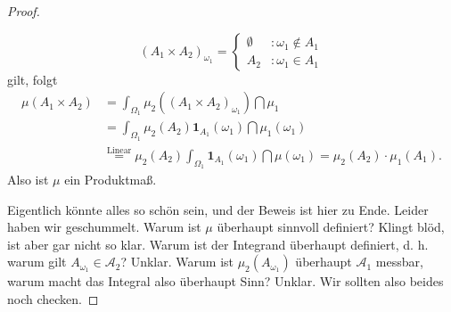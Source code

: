 \begin{proof}
\begin{enumerate}[label=(\roman*)]
	\[ (A_1\times A_2)_{\omega_1} = \begin{cases}
	\emptyset &:\omega_1 \notin A_1\\
	A_2 &:\omega_1 \in A_1
	\end{cases} \]
	gilt, folgt
	\begin{align*}
	\mu(A_1\times A_2) &= \int_{\Omega_1} \mu_2((A_1\times A_2)_{\omega_1}) \dint\mu_1\\
	& = \int_{\Omega_1} \mu_2(A_2) \mathbf{1}_{A_1}(\omega_1) \dint\mu_1(\omega_1) \\
	&\overset{\text{Linear}}{=} \mu_2(A_2) \int_{\Omega_1} \mathbf{1}_{A_1}(\omega_1) \dint\mu(\omega_1) =  \mu_2(A_2) \cdot \mu_1(A_1).
	\end{align*}
	Also ist $\mu$ ein Produktma\ss.
	\end{enumerate}
Eigentlich k\"onnte alles so sch\"on sein, und der Beweis ist hier zu Ende. Leider haben wir geschummelt. Warum ist $\mu$ \"uberhaupt sinnvoll definiert? Klingt bl\"od, ist aber gar nicht so klar. Warum ist der Integrand \"uberhaupt definiert, d. h. warum gilt $A_{\omega_1}\in \mathcal A_2$? Unklar. Warum ist $\mu_2(A_{\omega_1})$ \"uberhaupt $\mathcal A_1$ messbar, warum macht das Integral also \"uberhaupt Sinn? Unklar. Wir sollten also beides noch checken.\smallskip


\end{proof}
